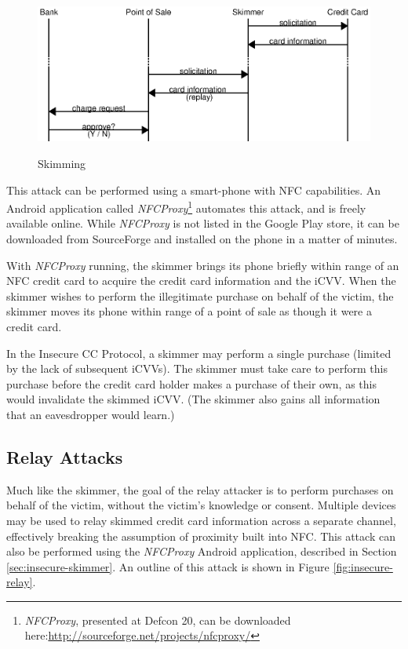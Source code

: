\begin{figure}
  \caption{Skimming}
  \centering
    \includegraphics{img/attack-3-skim.eps}
  \label{fig:insecure-skimmer}
\end{figure}

This attack can be performed using a smart-phone with NFC capabilities.
An Android application called \emph{NFCProxy}\footnote{\emph{NFCProxy}\cite{NFCProxy}, presented at Defcon 20, can be downloaded here:\newline\url{http://sourceforge.net/projects/nfcproxy/}} automates this attack, and is freely available online.
While \emph{NFCProxy} is not listed in the Google Play store, it can be downloaded from SourceForge and installed on the phone in a matter of minutes.

With \emph{NFCProxy} running, the skimmer brings its phone briefly within range of an NFC credit card to acquire the credit card information and  the iCVV.
When the skimmer wishes to perform the illegitimate purchase on behalf of the victim, the skimmer moves its phone within range of a point of sale as though it were a credit card.

In the Insecure CC Protocol, a skimmer may perform a single purchase (limited by the lack of subsequent iCVVs).
The skimmer must take care to perform this purchase before the credit card holder makes a purchase of their own, as this would invalidate the skimmed iCVV.
(The skimmer also gains all information that an eavesdropper would learn.)






\subsection{Relay Attacks}
\label{sec:insecure-relay}

Much like the skimmer, the goal of the relay attacker is to perform purchases on behalf of the victim, without the victim's knowledge or consent.
Multiple devices may be used to relay skimmed credit card information across a separate channel, effectively breaking the assumption of proximity built into NFC.
This attack can also be performed using the \emph{NFCProxy} Android application, described in Section \ref{sec:insecure-skimmer}.
An outline of this attack is shown in Figure \ref{fig:insecure-relay}.

